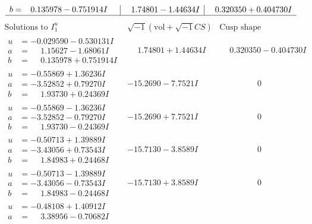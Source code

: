 \documentclass[1p]{elsarticle_modified}
\theoremstyle{definition}
\newcommand{\I}{\sqrt{-1}}
\begin{document}
$$\begin{array}{c|c|c}
\begin{aligned}
b &= \phantom{-}0.135978 - 0.751914 I\end{aligned}
 & \phantom{-}1.74801 - 1.44634 I & \phantom{-}0.320350 + 0.404730 I\\
 \hline 
 \end{array}$$\newpage$$\begin{array}{c|c|c}  
\text{Solutions to }I^u_{1}& \I (\text{vol} + \sqrt{-1}CS) & \text{Cusp shape}\\
 \hline 
\begin{aligned}
u &= -0.029590 - 0.530131 I \\
a &= \phantom{-}1.15627 - 1.68061 I \\
b &= \phantom{-}0.135978 + 0.751914 I\end{aligned}
 & \phantom{-}1.74801 + 1.44634 I & \phantom{-}0.320350 - 0.404730 I \\ \hline\begin{aligned}
u &= -0.55869 + 1.36236 I \\
a &= -3.52852 + 0.79270 I \\
b &= \phantom{-}1.93730 + 0.24369 I\end{aligned}
 & -15.2690 - 7.7521 I & \phantom{-0.000000 } 0 \\ \hline\begin{aligned}
u &= -0.55869 - 1.36236 I \\
a &= -3.52852 - 0.79270 I \\
b &= \phantom{-}1.93730 - 0.24369 I\end{aligned}
 & -15.2690 + 7.7521 I & \phantom{-0.000000 } 0 \\ \hline\begin{aligned}
u &= -0.50713 + 1.39889 I \\
a &= -3.43056 + 0.73543 I \\
b &= \phantom{-}1.84983 + 0.24468 I\end{aligned}
 & -15.7130 - 3.8589 I & \phantom{-0.000000 } 0 \\ \hline\begin{aligned}
u &= -0.50713 - 1.39889 I \\
a &= -3.43056 - 0.73543 I \\
b &= \phantom{-}1.84983 - 0.24468 I\end{aligned}
 & -15.7130 + 3.8589 I & \phantom{-0.000000 } 0 \\ \hline\begin{aligned}
u &= -0.48108 + 1.40912 I \\
a &= \phantom{-}3.38956 - 0.70682 I \\

\end{aligned}
\end{array}$$
\end{document}
